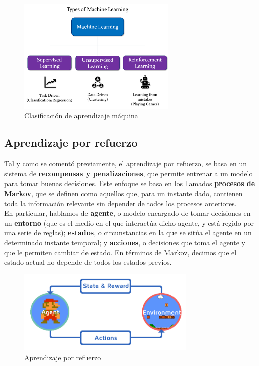 \begin{figure} [H]
	\begin{center}
	\includegraphics[height=5.5cm]{imagenes/cap1/8_AI_types.png}
	\end{center}
	\caption[Clasificación de aprendizaje máquina]{Clasificación de aprendizaje máquina}
	\label{fig:ai_types}
\end{figure}

\subsection{Aprendizaje por refuerzo}
\label{subsec:aprendizaje_por_refuerzo}

Tal y como se comentó previamente, el aprendizaje por refuerzo, se basa en un sistema de \textbf{recompensas y penalizaciones}, que permite entrenar a un modelo para tomar buenas decisiones. Este enfoque se basa en los llamados \textbf{procesos de Markov}, que se definen como aquellos que, para un instante dado, contienen toda la información relevante sin depender de todos los procesos anteriores. \cite{learn}\\

En particular, hablamos de \textbf{agente}, o modelo encargado de tomar decisiones en un \textbf{entorno} (que es el medio en el que interactúa dicho agente, y está regido por una serie de reglas); \textbf{estados}, o circunstancias en la que se sitúa el agente en un determinado instante temporal; y \textbf{acciones}, o decisiones que toma el agente y que le permiten cambiar de estado. En términos de Markov, decimos que el estado actual no depende de todos los estados previos. \cite{props-learn}\\

\begin{figure} [H]
	\begin{center}
	\includegraphics[height=4cm]{imagenes/cap1/9_reinforcement.png}
	\end{center}
	\caption[Aprendizaje por refuerzo]{Aprendizaje por refuerzo}
	\label{fig:reinforcement_learning}
\end{figure}

